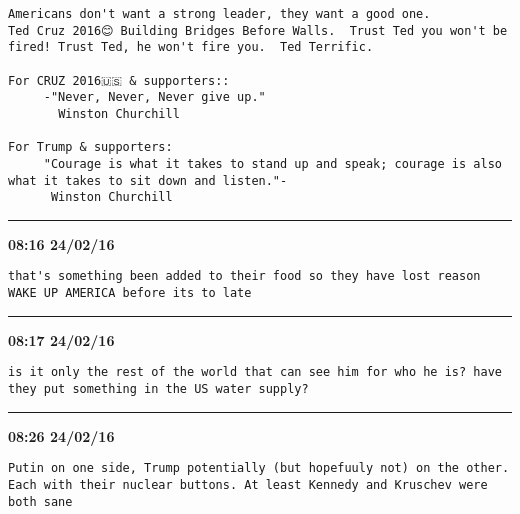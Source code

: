 \begin{adjustwidth}{0cm}{0cm}
\begin{lstlisting}[breaklines, breakatwhitespace, basicstyle=\small, frame=leftline]
Americans don't want a strong leader, they want a good one. 
Ted Cruz 2016😊 Building Bridges Before Walls.  Trust Ted you won't be fired! Trust Ted, he won't fire you.  Ted Terrific.

For CRUZ 2016🇺🇸 & supporters::
     -"Never, Never, Never give up."
       Winston Churchill

For Trump & supporters:
     "Courage is what it takes to stand up and speak; courage is also what it takes to sit down and listen."-  
      Winston Churchill
\end{lstlisting}
\end{adjustwidth}

\hrule%

\begin{adjustwidth}{0cm}{0cm}
\footnotesize \textbf{08:16 24/02/16}

\begin{lstlisting}[breaklines, breakatwhitespace, basicstyle=\small, frame=leftline]
that's something been added to their food so they have lost reason WAKE UP AMERICA before its to late
\end{lstlisting}
\end{adjustwidth}

\hrule%

\begin{adjustwidth}{0cm}{0cm}
\footnotesize \textbf{08:17 24/02/16}

\begin{lstlisting}[breaklines, breakatwhitespace, basicstyle=\small, frame=leftline]
is it only the rest of the world that can see him for who he is? have they put something in the US water supply?
\end{lstlisting}
\end{adjustwidth}

\hrule%

\begin{adjustwidth}{0cm}{0cm}
\footnotesize \textbf{08:26 24/02/16}

\begin{lstlisting}[breaklines, breakatwhitespace, basicstyle=\small, frame=leftline]
Putin on one side, Trump potentially (but hopefuuly not) on the other. Each with their nuclear buttons. At least Kennedy and Kruschev were both sane
\end{lstlisting}
\end{adjustwidth}


